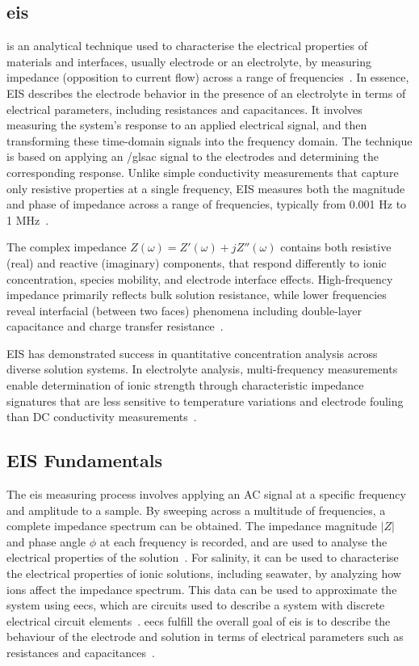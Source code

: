 \subsection{\gls{eis}}

 is an analytical technique used to characterise the electrical properties of materials and interfaces, usually electrode or an electrolyte, by measuring impedance (opposition to current flow) across a range of frequencies~\cite{canales_electrochemical_2021}.
In essence, EIS describes the electrode behavior in the presence of an electrolyte in terms of electrical parameters, including resistances and capacitances.
It involves measuring the system's response to an applied electrical signal, and then transforming these time-domain signals into the frequency domain.
The technique is based on applying an /gls{ac} signal to the electrodes and determining the corresponding response.
Unlike simple conductivity measurements that capture only resistive properties at a single frequency, EIS measures both the magnitude and phase of impedance across a range of frequencies, typically from 0.001 Hz to 1 MHz~\cite{barsoukov_impedance_2005}.

The complex impedance $Z(\omega)=Z'(\omega)+jZ''(\omega)$ contains both resistive (real) and reactive (imaginary) components, that respond differently to ionic concentration, species mobility, and electrode interface effects.
High-frequency impedance primarily reflects bulk solution resistance, while lower frequencies reveal interfacial (between two faces) phenomena including double-layer capacitance and charge transfer resistance~\cite{orazem_electrochemical_2008}.

EIS has demonstrated success in quantitative concentration analysis across diverse solution systems.
In electrolyte analysis, multi-frequency measurements enable determination of ionic strength through characteristic impedance signatures that are less sensitive to temperature variations and electrode fouling than DC conductivity measurements~\cite{barsoukov_impedance_2005}.


\subsection{EIS Fundamentals}
The \gls{eis} measuring process involves applying an AC signal at a specific frequency and amplitude to a sample.
By sweeping across a multitude of frequencies, a complete impedance spectrum can be obtained.
The impedance magnitude $|Z|$ and phase angle $\phi$ at each frequency is recorded, and are used to analyse the electrical properties of the solution~\cite{orazem_electrochemical_2008}.
For salinity, it can be used to characterise the electrical properties of ionic solutions, including seawater, by analyzing how ions affect the impedance spectrum. 
This data can be used to approximate the system using \glspl{eec}, which are circuits used to describe a system with discrete electrical circuit elements~\cite{barsoukov_impedance_2005}.
\glspl{eec} fulfill the overall goal of \gls{eis} is to describe the behaviour of the electrode and solution in terms of electrical parameters such as resistances and capacitances~\cite{canales_electrochemical_2021}.

